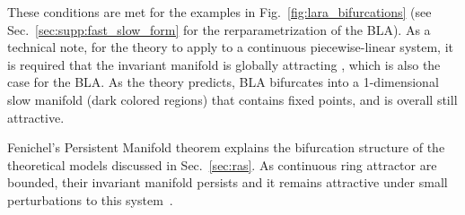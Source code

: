 \documentclass{article} %
\newcounter{ct}
\theoremstyle{definition}
\theoremstyle{remark}
\renewcommand{\cite}{\citep}
\begin{document}
These conditions are met for the examples in Fig.~\ref{fig:lara_bifurcations} (see Sec.~\ref{sec:supp:fast_slow_form} for the rerparametrization of the BLA).
 As a technical note, for the theory to apply to a continuous piecewise-linear system, it is required that the invariant manifold is globally attracting \cite{simpson2018}, which is also the case for the BLA.
As the theory predicts, BLA bifurcates into a 1-dimensional slow manifold (dark colored regions) that contains fixed points, and is overall still attractive.

Fenichel's Persistent Manifold theorem explains the bifurcation structure of the theoretical models discussed in Sec.~\ref{sec:ras}.
As continuous ring attractor are bounded, their invariant manifold persists and it remains attractive under small perturbations to this system~\citep{wiggins1994}.


\end{document}
